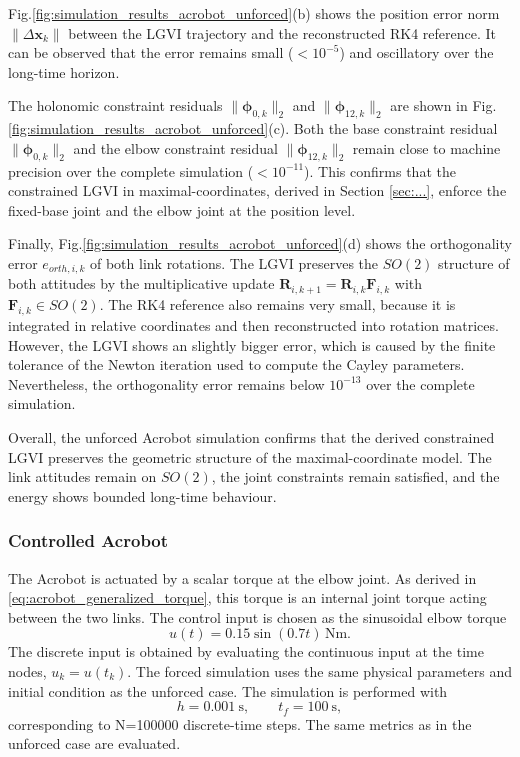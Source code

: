 Fig.\ref{fig:simulation_results_acrobot_unforced}(b) shows the position error norm $\|\Delta \bm{x}_k\|$ between the LGVI trajectory and the reconstructed RK4 reference. It can be observed that the error remains small ($< 10^{-5}$) and oscillatory over the long-time horizon.

The holonomic constraint residuals $\|\bm{\phi}_{0,k}\|_2$ and $\|\bm{\phi}_{12,k}\|_2$ are shown in Fig.\ref{fig:simulation_results_acrobot_unforced}(c). Both the base constraint residual $\|\bm{\phi}_{0,k}\|_2$ and the elbow constraint residual $\|\bm{\phi}_{12,k}\|_2$ remain close to machine precision over the complete simulation ($< 10^{-11}$). This confirms that the constrained LGVI in maximal-coordinates, derived in Section \ref{sec:...}, enforce the fixed-base joint and the elbow joint at the position level.

Finally, Fig.\ref{fig:simulation_results_acrobot_unforced}(d) shows the orthogonality error $e_{orth,i,k}$ of both link rotations. The LGVI preserves the $SO(2)$ structure of both attitudes by the multiplicative update $\bm{R}_{i,k+1}=\bm{R}_{i,k}\bm{F}_{i,k}$ with $\bm{F}_{i,k}\in SO(2)$. The RK4 reference also remains very small, because it is integrated in relative coordinates and then reconstructed into rotation matrices. However, the LGVI shows an slightly bigger error, which is caused by the finite tolerance of the Newton iteration used to compute the Cayley parameters. Nevertheless, the orthogonality error remains below $10^{-13}$ over the complete simulation.

Overall, the unforced Acrobot simulation confirms that the derived constrained LGVI preserves the geometric structure of the maximal-coordinate model. The link attitudes remain on $SO(2)$, the joint constraints remain satisfied, and the energy shows bounded long-time behaviour.

\subsubsection{Controlled Acrobot}

The Acrobot is actuated by a scalar torque at the elbow joint. As derived in \eqref{eq:acrobot_generalized_torque}, this torque is an internal joint torque acting between the two links.
The control input is chosen as the sinusoidal elbow torque
\[
u(t)=0.15\sin(0.7t)\,\si{\newton\meter}.
\]
The discrete input is obtained by evaluating the continuous input at the time nodes, $u_k=u(t_k)$. The forced simulation uses the same physical parameters and initial condition as the unforced case. The simulation is performed with
\[
h=\SI{0.001}{\second},
\qquad
t_f=\SI{100}{\second},
\]
corresponding to N=100000 discrete-time steps. The same metrics as in the unforced case are evaluated.

